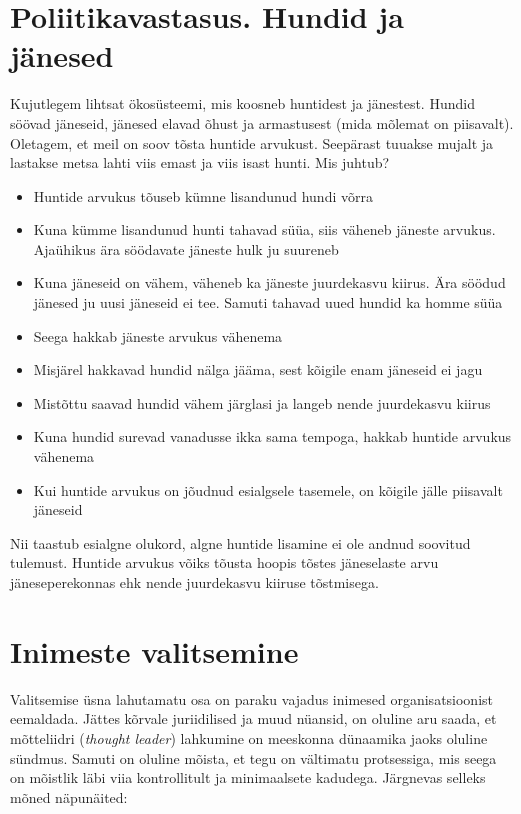 \documentclass{tufte-book}
\begin{document}
\section{Poliitikavastasus. Hundid ja jänesed}
Kujutlegem lihtsat ökosüsteemi, mis koosneb huntidest ja jänestest. Hundid söövad jäneseid, jänesed elavad õhust ja armastusest (mida mõlemat on piisavalt). Oletagem, et meil on soov tõsta huntide arvukust. Seepärast tuuakse mujalt ja lastakse metsa lahti viis emast ja viis isast hunti. Mis juhtub? 
\begin{itemize}
	\item Huntide arvukus tõuseb kümne lisandunud hundi võrra
	\item Kuna kümme lisandunud hunti tahavad süüa, siis väheneb jäneste arvukus. Ajaühikus ära söödavate jäneste hulk ju suureneb
	\item Kuna jäneseid on vähem, väheneb ka jäneste juurdekasvu kiirus. Ära söödud jänesed ju uusi jäneseid ei tee. Samuti tahavad uued hundid ka homme süüa
	\item Seega hakkab jäneste arvukus vähenema
	\item Misjärel hakkavad hundid nälga jääma, sest kõigile enam jäneseid ei jagu
	\item Mistõttu saavad hundid vähem järglasi ja langeb nende juurdekasvu kiirus
	\item Kuna hundid surevad vanadusse ikka sama tempoga, hakkab huntide arvukus vähenema
	\item Kui huntide arvukus on jõudnud esialgsele tasemele, on kõigile jälle piisavalt jäneseid 
\end{itemize}

Nii taastub esialgne olukord, algne huntide lisamine ei ole andnud soovitud tulemust. Huntide arvukus võiks tõusta hoopis tõstes jäneselaste arvu jäneseperekonnas ehk nende juurdekasvu kiiruse tõstmisega. 

\section{Inimeste valitsemine}
Valitsemise üsna lahutamatu osa on paraku vajadus inimesed organisatsioonist eemaldada. Jättes kõrvale juriidilised ja muud nüansid, on oluline aru saada, et mõtteliidri (\emph{thought leader}) lahkumine on meeskonna dünaamika jaoks oluline sündmus. Samuti on oluline mõista, et tegu on vältimatu protsessiga, mis seega on mõistlik läbi viia kontrollitult ja minimaalsete kadudega. Järgnevas selleks mõned näpunäited: 
\end{document}
